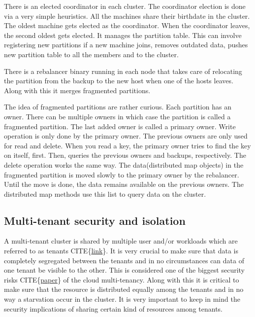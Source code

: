 \documentclass[12pt,titlepage]{article}
\begin{document}
There is an elected coordinator in each cluster. The coordinator election is
done via a very simple heuristics. All the machines share their birthdate in the
cluster. The oldest machine gets elected as the coordinator. When the
coordinator leaves, the second oldest gets elected. It manages the partition table.
This can involve registering new partitions if a new machine joins, removes
outdated data, pushes new partition table to all the members and to the cluster.

There is a rebalancer binary running in each node that takes care of relocating
the partition from the backup to the new host when one of the hosts leaves.
Along with this it merges fragmented partitions.

The idea of fragmented partitions are rather curious. Each partition has an
owner. There can be multiple owners in which case the partition is called a
fragmented partition. The last added owner is called a primary owner. Write
operation is only done by the primary owner. The previous owners are only used
for read and delete. When you read a key, the primary owner tries to find the
key on itself, first. Then, queries the previous owners and backups,
respectively. The delete operation works the same way. The data(distributed map
objects) in the fragmented partition is moved slowly to the primary owner by the
rebalancer. Until the move is done, the data remains available on the previous
owners. The distributed map methods use this list to query data on the cluster.


\subsection{Multi-tenant security and isolation}
\label{sec:orgd6213d6}
A multi-tenant cluster is shared by multiple user and/or workloads which are
referred to as tenants CITE\{\href{https://cloud.google.com/kubernetes-engine/docs/concepts/multitenancy-overview}{link}\}. It is very crucial to make sure that data is
completely segregated between the tenants and in no circumstances can data of
one tenant be visible to the other. This is considered one of the biggest
security risks CITE\{\href{https://www.researchgate.net/publication/321637564\_Cloud\_Multi-Tenancy\_Issues\_and\_Developments}{paper}\} of the cloud multi-tenancy. Along with this it is
critical to make sure that the resource is distributed equally among the tenants
and in no way a starvation occur in the cluster. It is very important to keep in
mind the security implications of sharing certain kind of resources among
tenants.
\end{document}
